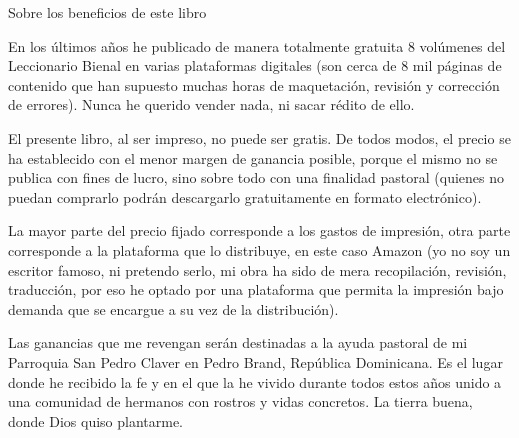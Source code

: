 \documentclass[]{article}
\begin{document}
Sobre los beneficios de este libro

En los últimos años he publicado de manera totalmente gratuita 8
volúmenes del Leccionario Bienal en varias plataformas digitales (son
cerca de 8 mil páginas de contenido que han supuesto muchas horas de
maquetación, revisión y corrección de errores). Nunca he querido vender
nada, ni sacar rédito de ello.

El presente libro, al ser impreso, no puede ser gratis. De todos modos,
el precio se ha establecido con el menor margen de ganancia posible,
porque el mismo no se publica con fines de lucro, sino sobre todo con
una finalidad pastoral (quienes no puedan comprarlo podrán descargarlo
gratuitamente en formato electrónico).

La mayor parte del precio fijado corresponde a los gastos de impresión,
otra parte corresponde a la plataforma que lo distribuye, en este caso
Amazon (yo no soy un escritor famoso, ni pretendo serlo, mi obra ha sido
de mera recopilación, revisión, traducción, por eso he optado por una
plataforma que permita la impresión bajo demanda que se encargue a su
vez de la distribución).

Las ganancias que me revengan serán destinadas a la ayuda pastoral de mi
Parroquia San Pedro Claver en Pedro Brand, República Dominicana. Es el
lugar donde he recibido la fe y en el que la he vivido durante todos
estos años unido a una comunidad de hermanos con rostros y vidas
concretos. La tierra buena, donde Dios quiso plantarme.
\end{document}
